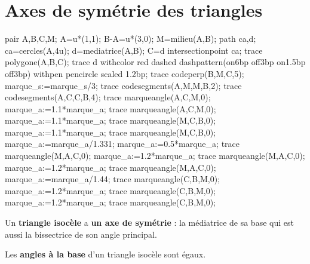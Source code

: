 \section{Axes de symétrie des triangles}
\begin{changemargin}{0mm}{-25mm}
\begin{minipage}{0.2\linewidth}
    \begin{Geometrie}[CoinHD={(5u,5.5u)}]
        pair A,B,C,M;
        A=u*(1,1);
        B-A=u*(3,0);
        M=milieu(A,B);
        path ca,d;
        ca=cercles(A,4u);
        d=mediatrice(A,B);
        C=d intersectionpoint ca;
        trace polygone(A,B,C);
        trace d withcolor red dashed dashpattern(on6bp off3bp on1.5bp off3bp) withpen pencircle scaled 1.2bp;
        trace codeperp(B,M,C,5);
        marque_s:=marque_s/3;
        trace codesegments(A,M,M,B,2);
        trace codesegments(A,C,C,B,4);
        trace marqueangle(A,C,M,0);
        marque_a:=1.1*marque_a;
        trace marqueangle(A,C,M,0);
        marque_a:=1.1*marque_a;
        trace marqueangle(M,C,B,0);
        marque_a:=1.1*marque_a;
        trace marqueangle(M,C,B,0);
        marque_a:=marque_a/1.331;
        marque_a:=0.5*marque_a;
        trace marqueangle(M,A,C,0);
        marque_a:=1.2*marque_a;
        trace marqueangle(M,A,C,0);
        marque_a:=1.2*marque_a;
        trace marqueangle(M,A,C,0);
        marque_a:=marque_a/1.44;
        trace marqueangle(C,B,M,0);
        marque_a:=1.2*marque_a;
        trace marqueangle(C,B,M,0);
        marque_a:=1.2*marque_a;
        trace marqueangle(C,B,M,0);
    \end{Geometrie}
\end{minipage}
\begin{minipage}{0.75\linewidth}
    \begin{propriete}[\admise]
        Un \textbf{triangle isocèle} a \textbf{un axe de symétrie} : la médiatrice de sa base qui est aussi la bissectrice de son angle principal.
    \end{propriete}
    \begin{remarque}

        Les \textbf{angles à la base} d'un triangle isocèle sont égaux.
    \end{remarque}
\end{minipage}


\end{changemargin}

